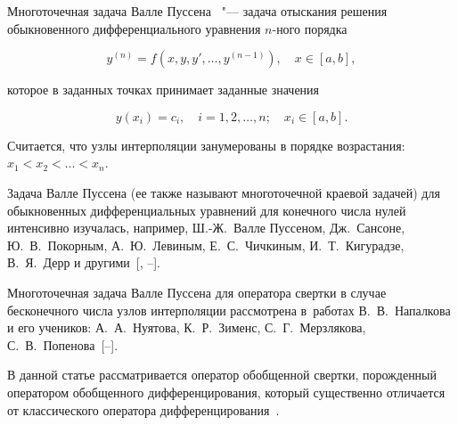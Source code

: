 


\date{15/XII/2014} %





\makerutitle










Многоточечная задача Валле Пуссена~\cite{napal:bib1} "--- задача отыскания решения обыкновенного дифференциального уравнения $n$-ного порядка

$$

y^{(n)} = f(x, y, y', \ldots, y^{(n-1)}), \quad  x \in [a, b],

$$

которое в заданных точках принимает заданные значения

$$

y(x_i)= c_i, \quad i = 1, 2, \ldots, n; \quad x_i \in [a, b].

$$

 Считается, что узлы интерполяции занумерованы в порядке возрастания: $x_1 < x_2 < \ldots < x_n.$



 Задача Валле Пуссена (ее также называют многоточечной краевой задачей) для обыкновенных дифференциальных уравнений для конечного числа нулей интенсивно изучалась, например, Ш.-Ж.~Валле Пуссеном, Дж.~Сансоне, Ю.~В.~Покорным, А.~Ю.~Левиным, Е.~С.~Чичкиным, И.~Т.~Кигурадзе, В.~Я.~Дерр и другими~[, --].



Многоточечная задача Валле Пуссена для оператора свертки в случае бесконечного числа узлов интерполяции рассмотрена в~работах В.~В.~Напалкова  и его учеников:  А.~А.~Нуятова, К.~Р.~Зименс, С.~Г.~Мерзлякова, С.~В.~Попенова~[--].



В данной статье рассматривается  оператор обобщенной свертки, порожденный оператором обобщенного дифференцирования, который существенно отличается от классического оператора дифференцирования~\cite{napal:bib13,napal:bib14,napal:bib18}.



